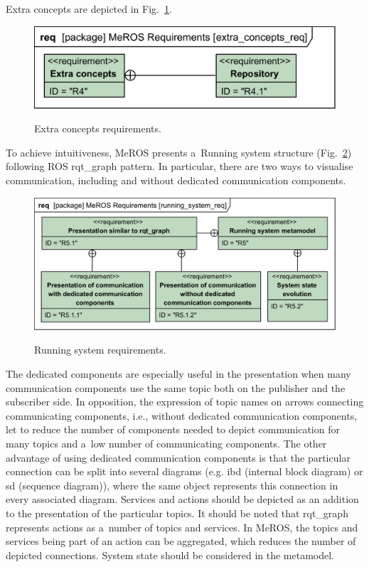 \documentclass[11pt,oneside,a4paper]{report}
\begin{document}
Extra concepts are depicted in Fig.~\ref{fig:extra_concepts_req}.

\begin{figure}[H]
	\centering
	\begin{center}
		{\includegraphics[scale=1.0]{diagrams/extra_concepts_req.png}}
	\end{center}
	\caption{Extra concepts requirements.} 
	\label{fig:extra_concepts_req}
\end{figure}


	To achieve intuitiveness, MeROS presents a~Running system structure (Fig.~\ref{fig:running_system_req}) following ROS rqt\_graph pattern. In particular, there are two ways to visualise communication, including and without	dedicated communication components.
	\begin{figure}[H]
		\centering
		\begin{center}
			{\includegraphics[scale=1.0]{diagrams/running_system_req.png}}
		\end{center}
		\caption{Running system requirements. } 
		\label{fig:running_system_req}
	\end{figure}
	 The dedicated components are especially useful in the presentation when many communication components use the same topic both on the publisher and the subscriber side. In opposition, the expression of topic names on arrows connecting communicating components, i.e., without dedicated communication components, let to reduce the number of components needed to depict communication for many topics and a~low number of communicating components. The other advantage of using dedicated communication components is that the particular connection can be split into several diagrams (e.g. ibd (internal block diagram) or sd (sequence diagram)), where the same object represents this connection in every associated diagram. Services and actions should be depicted as an addition to the presentation of the particular topics. It should be noted that rqt\_graph represents actions as a~number of topics and services. In MeROS, the topics and services being part of an action can be aggregated, which reduces the number of depicted connections. System state should be considered in the metamodel.
		
\end{document}
